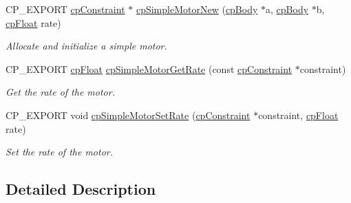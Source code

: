\begin{DoxyCompactItemize}
C\+P\+\_\+\+E\+X\+P\+O\+RT \mbox{\hyperlink{structcp_constraint}{cp\+Constraint}} $\ast$ \mbox{\hyperlink{group__cp_simple_motor_ga397f20104311c7f5427cc6d5daa7191e}{cp\+Simple\+Motor\+New}} (\mbox{\hyperlink{structcp_body}{cp\+Body}} $\ast$a, \mbox{\hyperlink{structcp_body}{cp\+Body}} $\ast$b, \mbox{\hyperlink{group__basic_types_gac1ed65573e035bf892505768c852d8d3}{cp\+Float}} rate)
\begin{DoxyCompactList}\small\item\em Allocate and initialize a simple motor. \end{DoxyCompactList}\item 
\mbox{\label{group__cp_simple_motor_gabff92055a8625efe698830a8ee2b1757}} 
C\+P\+\_\+\+E\+X\+P\+O\+RT \mbox{\hyperlink{group__basic_types_gac1ed65573e035bf892505768c852d8d3}{cp\+Float}} \mbox{\hyperlink{group__cp_simple_motor_gabff92055a8625efe698830a8ee2b1757}{cp\+Simple\+Motor\+Get\+Rate}} (const \mbox{\hyperlink{structcp_constraint}{cp\+Constraint}} $\ast$constraint)
\begin{DoxyCompactList}\small\item\em Get the rate of the motor. \end{DoxyCompactList}\item 
\mbox{\label{group__cp_simple_motor_gaadfe5fd9e818af5dc28929f004092b1b}} 
C\+P\+\_\+\+E\+X\+P\+O\+RT void \mbox{\hyperlink{group__cp_simple_motor_gaadfe5fd9e818af5dc28929f004092b1b}{cp\+Simple\+Motor\+Set\+Rate}} (\mbox{\hyperlink{structcp_constraint}{cp\+Constraint}} $\ast$constraint, \mbox{\hyperlink{group__basic_types_gac1ed65573e035bf892505768c852d8d3}{cp\+Float}} rate)
\begin{DoxyCompactList}\small\item\em Set the rate of the motor. \end{DoxyCompactList}\end{DoxyCompactItemize}


\subsection{Detailed Description}
